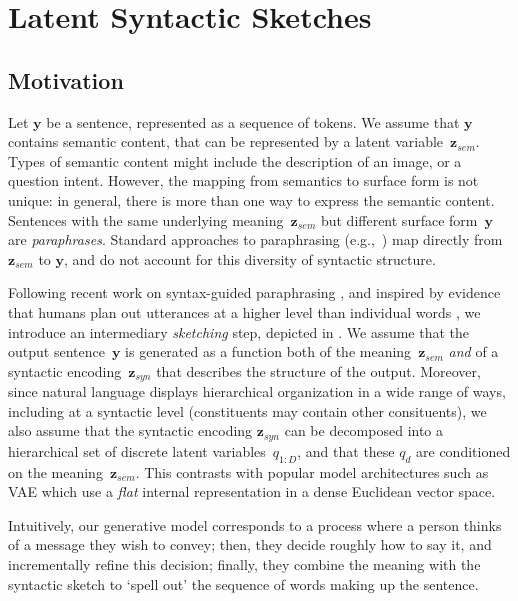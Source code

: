 \documentclass[11pt]{article}
\begin{document}
\section{Latent Syntactic Sketches}

\subsection{Motivation}

Let $\textbf{y}$ be a sentence, represented as a sequence of
tokens. We assume that $\textbf{y}$ contains semantic content, that
can be represented by a latent variable~$\textbf{z}_{sem}$. Types of
semantic content might include the description of an image, or a
question intent. However, the mapping from semantics to surface form
is not unique: in general, there is more than one way to express the
semantic content. Sentences with the same underlying
meaning~$\textbf{z}_{sem}$ but different surface form~$\textbf{y}$ are
\textit{paraphrases}. Standard approaches to paraphrasing
(e.g.,~\citealt{bowman-etal-2016-generating}) map directly from
$\textbf{z}_{sem}$ to $\textbf{y}$, and do not account for this
diversity of syntactic structure.



Following recent work on syntax-guided paraphrasing
\cite{chen-etal-2019-controllable,hosking-lapata-2021-factorising},
and inspired by evidence that humans plan out utterances at a higher
level than individual words \cite{martin2010planning}, we introduce an
intermediary \textit{sketching} step, depicted in
. We assume that the output sentence~$\textbf{y}$
is generated as a function both of the meaning~$\textbf{z}_{sem}$
\textit{and} of a syntactic encoding~$\textbf{z}_{syn}$ that describes
the structure of the output. Moreover, since natural language displays
hierarchical organization in a wide range of ways, including at a
syntactic level (constituents may contain other consituents), we also
assume that the syntactic encoding $\textbf{z}_{syn}$ can be
decomposed into a hierarchical set of discrete latent
variables~$q_{1:D}$, and that these $q_d$ are conditioned on the
meaning~$\textbf{z}_{sem}$. This contrasts with
popular model architectures such as VAE \cite{bowman-ppvae} which use a
\emph{flat} internal representation in a dense Euclidean vector space.


Intuitively, our generative model corresponds to a process where a person thinks of a message they wish to convey; then, they decide roughly how to say it, and incrementally refine this decision; finally, they combine the meaning with the syntactic sketch to `spell out' the sequence of words making up the sentence. 
\end{document}
